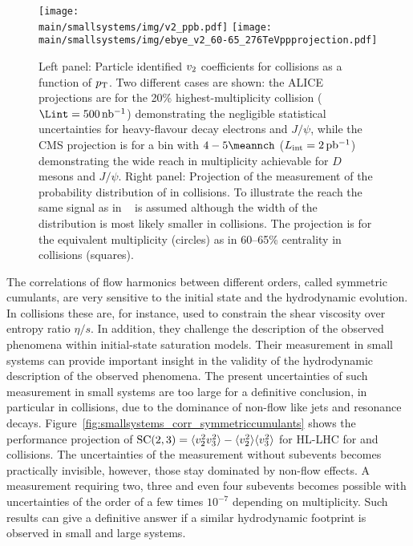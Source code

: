 \documentclass[../report.tex]{subfiles}
\providecommand{\main}{..}
\begin{document}
\begin{figure}[t!]
\centering
\texttt{[image: \\main/smallsystems/img/v2\_ppb.pdf]}
\hfill
\texttt{[image: \\main/smallsystems/img/ebye\_v2\_60-65\_276TeVppprojection.pdf]}
\caption{Left panel: Particle identified $v_{\rm{2}}$ coefficients for \pPb collisions as a function of $p\sb{\scriptstyle\mathrm{T}}$. Two different cases are shown: the ALICE projections are for the 20\% highest-multiplicity collision ($\Lint = \unit[500]{nb^{-1}}$) demonstrating the negligible statistical uncertainties for heavy-flavour decay electrons and $J/\psi$, while the CMS projection is for a bin with $4-5 \meannch$ ($L_{\rm int} = \unit[2]{pb^{-1}}$) demonstrating the wide reach in multiplicity achievable for $D$ mesons and $J/\psi$. 
Right panel: Projection of the measurement of the probability distribution of \vtwo in \pp collisions. To illustrate the reach the same signal as in \PbPb~\cite{Aad:2013xma} is assumed although the width of the distribution is most likely smaller in \pp collisions. The projection is for the equivalent \pp multiplicity (circles) as in 60--65\% centrality in \PbPb collisions (squares).}
\label{fig:smallsystems_corr_pid_pvn}
\end{figure}

The correlations of flow harmonics between different orders, called symmetric cumulants, are very sensitive to the initial state and the hydrodynamic evolution. In \PbPb collisions these are, for instance, used to constrain the shear viscosity over entropy ratio $\eta/s$. In addition, they challenge the description of the observed phenomena within initial-state saturation models.
Their measurement in small systems can provide important insight in the validity of the hydrodynamic description of the observed phenomena. The present uncertainties of such measurement in small systems are too large for a definitive conclusion, in particular in \pp collisions, due to the dominance of non-flow like jets and resonance decays. Figure~\ref{fig:smallsystems_corr_symmetriccumulants} shows the performance projection of ${\rm SC}(2,3) = \langle v_2^2 v_3^2 \rangle - \langle v_2^2 \rangle \langle v_3^2 \rangle$ for HL-LHC for \pp and \pPb collisions. The uncertainties of the measurement without subevents becomes practically invisible, however, those stay dominated by non-flow effects. A measurement requiring two, three and even four subevents becomes possible with uncertainties of the order of a few times $10^{-7}$ depending on multiplicity. Such results can give a definitive answer if a similar hydrodynamic footprint is observed in small and large systems.
\end{document}
